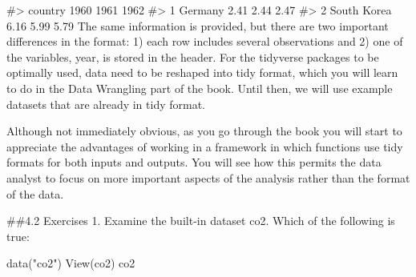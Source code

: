 \documentclass[
]{article}
\newenvironment{Shaded}{\begin{snugshade}}{\end{snugshade}}
\newcommand{\FunctionTok}[1]{\textcolor[rgb]{0.00,0.00,0.00}{#1}}
\newcommand{\NormalTok}[1]{#1}
\newcommand{\StringTok}[1]{\textcolor[rgb]{0.31,0.60,0.02}{#1}}
\begin{document}
\#\textgreater{} country 1960 1961 1962 \#\textgreater{} 1 Germany 2.41
2.44 2.47 \#\textgreater{} 2 South Korea 6.16 5.99 5.79 The same
information is provided, but there are two important differences in the
format: 1) each row includes several observations and 2) one of the
variables, year, is stored in the header. For the tidyverse packages to
be optimally used, data need to be reshaped into tidy format, which you
will learn to do in the Data Wrangling part of the book. Until then, we
will use example datasets that are already in tidy format.

Although not immediately obvious, as you go through the book you will
start to appreciate the advantages of working in a framework in which
functions use tidy formats for both inputs and outputs. You will see how
this permits the data analyst to focus on more important aspects of the
analysis rather than the format of the data.

\#\#4.2 Exercises 1. Examine the built-in dataset co2. Which of the
following is true:

\begin{Shaded}
\begin{Highlighting}[]
\FunctionTok{data}\NormalTok{(}\StringTok{"co2"}\NormalTok{)}
\FunctionTok{View}\NormalTok{(co2)}
\NormalTok{co2}
\end{Highlighting}
\end{Shaded}
\end{document}
